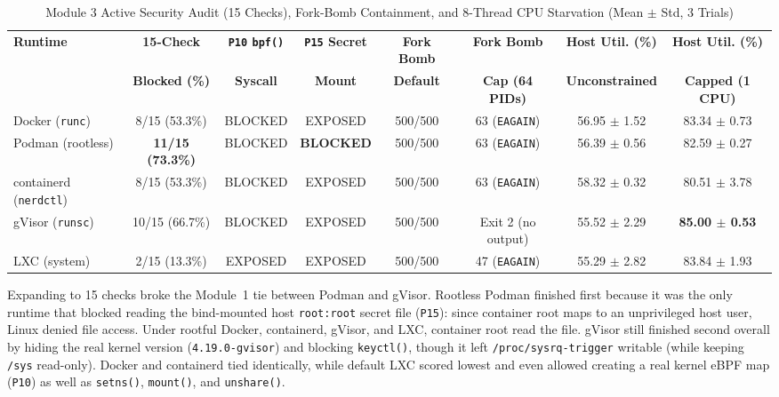 \documentclass[conference]{IEEEtran}
\begin{document}
\begin{table}[t]
\centering
\caption{Module 3 Active Security Audit (15 Checks), Fork-Bomb Containment, and 8-Thread CPU Starvation (Mean $\pm$ Std, 3 Trials)}
\label{tab:m3_summary}
\begin{tabular}{lccccccc}
\toprule
\textbf{Runtime} & \textbf{15-Check} & \textbf{\texttt{P10} \texttt{bpf()}} & \textbf{\texttt{P15} Secret} & \textbf{Fork Bomb} & \textbf{Fork Bomb} & \textbf{Host Util. (\%)} & \textbf{Host Util. (\%)} \\
 & \textbf{Blocked (\%)} & \textbf{Syscall} & \textbf{Mount} & \textbf{Default} & \textbf{Cap (64 PIDs)} & \textbf{Unconstrained} & \textbf{Capped (1 CPU)} \\
\midrule
Docker (\texttt{runc})        & 8/15 (53.3\%)  & BLOCKED & EXPOSED & 500/500 & 63 (\texttt{EAGAIN}) & 56.95 $\pm$ 1.52 & 83.34 $\pm$ 0.73 \\
Podman (rootless)             & \textbf{11/15 (73.3\%)} & BLOCKED & \textbf{BLOCKED} & 500/500 & 63 (\texttt{EAGAIN}) & 56.39 $\pm$ 0.56 & 82.59 $\pm$ 0.27 \\
containerd (\texttt{nerdctl}) & 8/15 (53.3\%)  & BLOCKED & EXPOSED & 500/500 & 63 (\texttt{EAGAIN}) & 58.32 $\pm$ 0.32 & 80.51 $\pm$ 3.78 \\
gVisor (\texttt{runsc})       & 10/15 (66.7\%) & BLOCKED & EXPOSED & 500/500 & Exit 2 (no output)   & 55.52 $\pm$ 2.29 & \textbf{85.00 $\pm$ 0.53} \\
LXC (system)                  & 2/15 (13.3\%)  & EXPOSED & EXPOSED & 500/500 & 47 (\texttt{EAGAIN}) & 55.29 $\pm$ 2.82 & 83.84 $\pm$ 1.93 \\
\bottomrule
\end{tabular}
\end{table}

Expanding to 15 checks broke the Module~1 tie between Podman and gVisor. Rootless Podman finished first because it was the only runtime that blocked reading the bind-mounted host \texttt{root:root} secret file (\texttt{P15}): since container root maps to an unprivileged host user, Linux denied file access. Under rootful Docker, containerd, gVisor, and LXC, container root read the file. gVisor still finished second overall by hiding the real kernel version (\texttt{4.19.0-gvisor}) and blocking \texttt{keyctl()}, though it left \texttt{/proc/sysrq-trigger} writable (while keeping \texttt{/sys} read-only). Docker and containerd tied identically, while default LXC scored lowest and even allowed creating a real kernel eBPF map (\texttt{P10}) as well as \texttt{setns()}, \texttt{mount()}, and \texttt{unshare()}.
\end{document}
